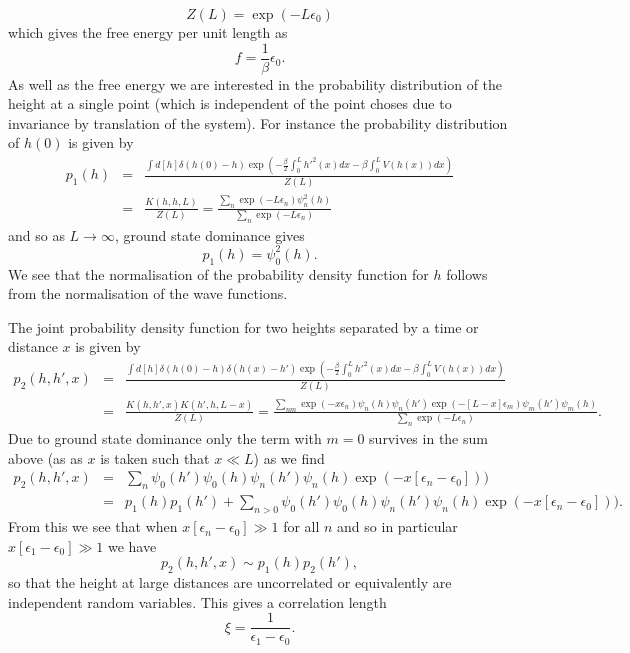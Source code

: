 \begin{equation}
Z(L) =\exp(-L\epsilon_0)
\end{equation}
which gives the free energy per unit length as
\begin{equation}
f=\frac{1}{\beta}\epsilon_0.
\end{equation}
As well as the free energy we are interested in the probability distribution of the height at a single point (which is independent of the point choses due to invariance by translation of the system). For instance the probability distribution of $h(0)$ is given by
\begin{eqnarray}
p_1(h)&=& \frac{\int d[h]\delta(h(0)-h)\exp\left(-\frac{\beta}{2}\int_0^L h'^2(x) dx -\beta\int_0^L  V(h(x)) dx\right)}{Z(L)}\\
&=& \frac{K(h,h,L)}{Z(L)}=\frac{\sum_n \exp(-L\epsilon_n)\psi_n^2(h)}{\sum_n \exp(-L\epsilon_n)}
\end{eqnarray}
and so as $L\to\infty$, ground state dominance gives
\begin{equation}
p_1(h)= \psi_0^2(h).
\end{equation}
We see that the normalisation of the probability density function for $h$ follows from the 
normalisation of the wave functions.

The joint probability density function for two heights separated by a time or distance $x$ is given by
\begin{eqnarray}
p_2(h,h',x)&=& \frac{\int d[h]\delta(h(0)-h)\delta(h(x)-h')\exp\left(-\frac{\beta}{2}\int_0^L h'^2(x) dx -\beta\int_0^L  V(h(x)) dx\right)}{Z(L)}\\
&=& \frac{K(h,h',x)K(h',h,L-x)}{Z(L)} = \frac{\sum_{nm} \exp(-x\epsilon_n)\psi_n(h)\psi_n(h')\exp(-[L-x]\epsilon_m)\psi_m(h')\psi_m(h)}{\sum_n \exp(-L\epsilon_n)}.
\end{eqnarray}
Due to ground state dominance only the term with $m=0$ survives in the sum above (as
as $x$ is taken such that $x\ll L$) as we find
\begin{eqnarray}
p_2(h,h',x) &=& \sum_{n} \psi_0(h')\psi_0(h)\psi_n(h')\psi_n(h)\exp(-x[\epsilon_n-\epsilon_0]))\\
&=& p_1(h)p_1(h') + \sum_{n>0} \psi_0(h')\psi_0(h)\psi_n(h')\psi_n(h)\exp(-x[\epsilon_n-\epsilon_0])).
\end{eqnarray}
From this we see that when $x[\epsilon_n-\epsilon_0] \gg1 $ for all $n$ and so in particular $x[\epsilon_1-\epsilon_0] \gg1$ we have 
\begin{equation}
p_2(h,h',x) \sim p_1(h)p_2(h'),
\end{equation}
so that the height at large distances are uncorrelated or equivalently are independent random variables. This gives a correlation length
\begin{equation}
\xi = \frac{1}{\epsilon_1-\epsilon_0}.\label{clq}
\end{equation}
